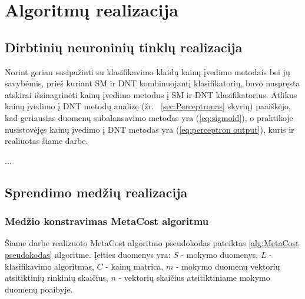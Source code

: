 \section{Algoritmų realizacija}
\subsection{Dirbtinių neuroninių tinklų realizacija}
\label{sec:Dirbtinių neuroninių tinklų realizacija}

Norint geriau susipažinti su klasifikavimo klaidų kainų įvedimo metodais bei jų
savybėmis, prieš kuriant SM ir DNT kombinuojantį klasifikatorių, buvo nuspręsta atskirai
išsinagrinėti kainų įvedimo metodus į SM ir DNT klasifikatorius. Atlikus kainų
įvedimo į DNT metodų analizę (žr. ~\ref{sec:Perceptronas} skyrių) paaiškėjo,
kad geriausias duomenų subalansavimo metodas yra (\ref{eq:sigmoid}), o
praktikoje nusistovėjęs kainų įvedimo į DNT metodas yra (\ref{eq:perceptron output}),
kuris ir realiuotas šiame darbe.

...

\subsection{Sprendimo medžių realizacija}
\subsubsection{Medžio konstravimas MetaCost algoritmu}\label{sec:Medžio konstravimas MetaCost algoritmu}

Šiame darbe realizuoto MetaCost algoritmo pseudokodas pateiktas \ref{alg:MetaCost pseudokodas} algoritme. Įeities duomenys yra: $S$ - mokymo duomenys, $L$ - klasifikavimo algoritmas, $C$ - kainų matrica, $m$ - mokymo duomenų vektorių atsitiktinių rinkinių skaičius, $n$ - vektorių skaičius atsitiktiniame mokymo duomenų poaibyje.

